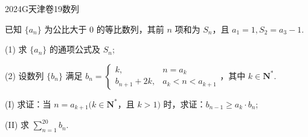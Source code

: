 
\begin{problem}{2024}{G}{天津卷}{19}{数列}

已知 $\{a_n\}$ 为公比大于 0 的等比数列，其前 $n$ 项和为 $S_n$，且 $a_1=1, S_2=a_3-1$.

(1) 求 $\{a_n\}$ 的通项公式及 $S_n$;

(2) 设数列 $\{b_n\}$ 满足 $b_n=\begin{cases} k, & n=a_k \\ b_{n+1}+2k, & a_k<n<a_{k+1} \end{cases}$，其中 $k \in \mathbf{N}^*$.

(I) 求证：当 $n=a_{k+1}(k \in \mathbf{N}^*$，且 $k>1)$ 时，求证：$b_{n-1} \geqslant a_k \cdot b_n$;

(II) 求 $\sum\limits_{n=1}^{20} b_n$.

\end{problem}